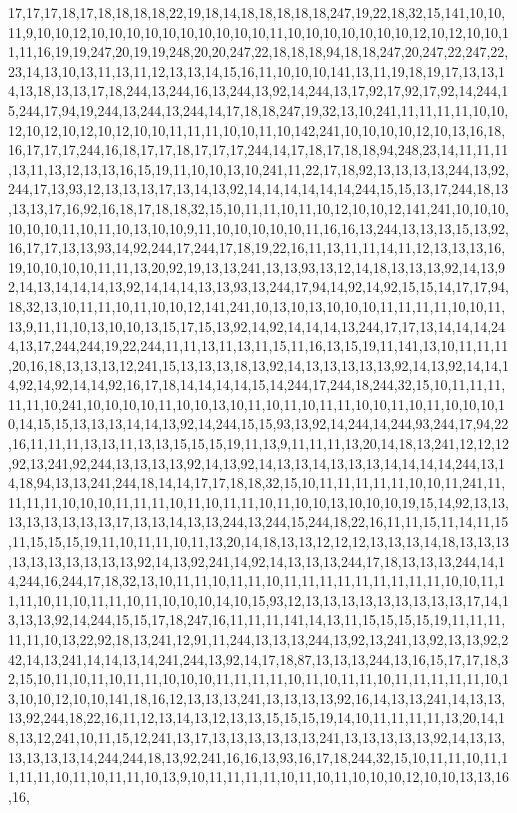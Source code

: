 17,17,17,18,17,18,18,18,18,22,19,18,14,18,18,18,18,18,247,19,22,18,32,15,141,10,10,11,9,10,10,12,10,10,10,10,10,10,10,10,10,10,11,10,10,10,10,10,10,10,12,10,12,10,10,11,11,16,19,19,247,20,19,19,248,20,20,247,22,18,18,18,94,18,18,247,20,247,22,247,22,23,14,13,10,13,11,13,11,12,13,13,14,15,16,11,10,10,10,141,13,11,19,18,19,17,13,13,14,13,18,13,13,17,18,244,13,244,16,13,244,13,92,14,244,13,17,92,17,92,17,92,14,244,15,244,17,94,19,244,13,244,13,244,14,17,18,18,247,19,32,13,10,241,11,11,11,11,10,10,12,10,12,10,12,10,12,10,10,11,11,11,10,10,11,10,142,241,10,10,10,10,12,10,13,16,18,16,17,17,17,244,16,18,17,17,18,17,17,17,244,14,17,18,17,18,18,94,248,23,14,11,11,11,13,11,13,12,13,13,16,15,19,11,10,10,13,10,241,11,22,17,18,92,13,13,13,13,244,13,92,244,17,13,93,12,13,13,13,17,13,14,13,92,14,14,14,14,14,14,244,15,15,13,17,244,18,13,13,13,17,16,92,16,18,17,18,18,32,15,10,11,11,10,11,10,12,10,10,12,141,241,10,10,10,10,10,10,11,10,11,10,13,10,10,9,11,10,10,10,10,10,11,16,16,13,244,13,13,13,15,13,92,16,17,17,13,13,93,14,92,244,17,244,17,18,19,22,16,11,13,11,11,14,11,12,13,13,13,16,19,10,10,10,10,11,11,13,20,92,19,13,13,241,13,13,93,13,12,14,18,13,13,13,92,14,13,92,14,13,14,14,14,13,92,14,14,14,13,13,93,13,244,17,94,14,92,14,92,15,15,14,17,17,94,18,32,13,10,11,11,10,11,10,10,12,141,241,10,13,10,13,10,10,10,11,11,11,11,10,10,11,13,9,11,11,10,13,10,10,13,15,17,15,13,92,14,92,14,14,14,13,244,17,17,13,14,14,14,244,13,17,244,244,19,22,244,11,11,13,11,13,11,15,11,16,13,15,19,11,141,13,10,11,11,11,20,16,18,13,13,13,12,241,15,13,13,13,18,13,92,14,13,13,13,13,13,92,14,13,92,14,14,14,92,14,92,14,14,92,16,17,18,14,14,14,14,15,14,244,17,244,18,244,32,15,10,11,11,11,11,11,10,241,10,10,10,10,11,10,10,13,10,11,10,11,10,11,11,10,10,11,10,11,10,10,10,10,14,15,15,13,13,13,14,14,13,92,14,244,15,15,93,13,92,14,244,14,244,93,244,17,94,22,16,11,11,11,13,13,11,13,13,15,15,15,19,11,13,9,11,11,11,13,20,14,18,13,241,12,12,12,92,13,241,92,244,13,13,13,13,92,14,13,92,14,13,13,14,13,13,13,14,14,14,14,244,13,14,18,94,13,13,241,244,18,14,14,17,17,18,18,32,15,10,11,11,11,11,11,10,10,11,241,11,11,11,11,10,10,10,11,11,11,10,11,10,11,11,10,11,10,10,13,10,10,10,19,15,14,92,13,13,13,13,13,13,13,13,17,13,13,14,13,13,244,13,244,15,244,18,22,16,11,11,15,11,14,11,15,11,15,15,15,19,11,10,11,11,10,11,13,20,14,18,13,13,12,12,12,13,13,13,14,18,13,13,13,13,13,13,13,13,13,13,92,14,13,92,241,14,92,14,13,13,13,244,17,18,13,13,13,244,14,14,244,16,244,17,18,32,13,10,11,11,10,11,11,10,11,11,11,11,11,11,11,11,11,10,10,11,11,11,10,11,10,11,11,10,11,10,10,10,14,10,15,93,12,13,13,13,13,13,13,13,13,13,17,14,13,13,13,92,14,244,15,15,17,18,247,16,11,11,11,141,14,13,11,15,15,15,15,19,11,11,11,11,11,10,13,22,92,18,13,241,12,91,11,244,13,13,13,244,13,92,13,241,13,92,13,13,92,242,14,13,241,14,14,13,14,241,244,13,92,14,17,18,87,13,13,13,244,13,16,15,17,17,18,32,15,10,11,10,11,10,11,11,10,10,10,11,11,11,11,10,11,10,11,11,10,11,11,11,11,11,10,13,10,10,12,10,10,141,18,16,12,13,13,13,241,13,13,13,13,92,16,14,13,13,241,14,13,13,13,92,244,18,22,16,11,12,13,14,13,12,13,13,15,15,15,19,14,10,11,11,11,11,13,20,14,18,13,12,241,10,11,15,12,241,13,17,13,13,13,13,13,13,241,13,13,13,13,13,92,14,13,13,13,13,13,13,14,244,244,18,13,92,241,16,16,13,93,16,17,18,244,32,15,10,11,11,10,11,11,11,11,10,11,10,11,11,10,13,9,10,11,11,11,11,10,11,10,11,10,10,10,12,10,10,13,13,16,16,
